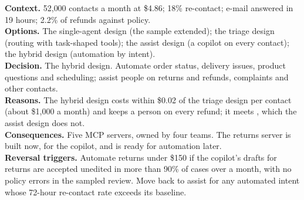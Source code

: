 \begin{tcolorbox}[colback=white, colframe=black!45, boxrule=0.4pt, arc=1pt, fontupper=\small, title={DR-SUP-001: The hybrid design, automating by intent}, fonttitle=\bfseries\small, coltitle=black, colbacktitle=codefill]
\textbf{Context.} 52{,}000 contacts a month at \$4.86; 18\% re-contact; e-mail answered in 19 hours; 2.2\% of refunds against policy.\\
\textbf{Options.} The single-agent design (the sample extended); the triage design (routing with task-shaped tools); the assist design (a copilot on every contact); the hybrid design (automation by intent).\\
\textbf{Decision.} The hybrid design. Automate order status, delivery issues, product questions and scheduling; assist people on returns and refunds, complaints and other contacts.\\
\textbf{Reasons.} The hybrid design costs within \$0.02 of the triage design per contact (about \$1{,}000 a month) and keeps a person on every refund; it meets , which the assist design does not.\\
\textbf{Consequences.} Five MCP servers, owned by four teams. The returns server is built now, for the copilot, and is ready for automation later.\\
\textbf{Reversal triggers.} Automate returns under \$150 if the copilot's drafts for returns are accepted unedited in more than 90\% of cases over a month, with no policy errors in the sampled review. Move back to assist for any automated intent whose 72-hour re-contact rate exceeds its baseline.
\end{tcolorbox}
